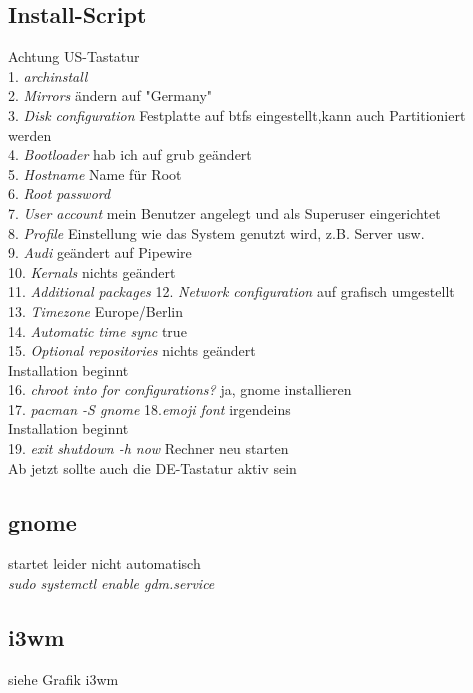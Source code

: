 \documentclass[10pt,a4paper,twoside]{book}
\begin{document}
\subsection{Install-Script}
Achtung US-Tastatur\\
1. \textit{archinstall}\\
2. \textit{Mirrors} ändern auf "Germany"\\
3. \textit{Disk configuration} Festplatte auf btfs eingestellt,kann auch Partitioniert werden\\
4. \textit{Bootloader} hab ich auf grub geändert\\
5. \textit{Hostname} Name für Root\\
6. \textit{Root password} \\
7. \textit{User account} mein Benutzer angelegt und als Superuser eingerichtet\\
8. \textit{Profile} Einstellung wie das System genutzt wird, z.B. Server usw.\\
9. \textit{Audi} geändert auf Pipewire\\
10. \textit{Kernals} nichts geändert\\
11. \textit{Additional packages}
12. \textit{Network configuration} auf grafisch umgestellt\\
13. \textit{Timezone} Europe/Berlin\\
14. \textit{Automatic time sync} true\\
15. \textit{Optional repositories} nichts geändert\\
Installation beginnt\\
16. \textit{chroot into for configurations?} ja, gnome installieren\\
17. \textit{pacman -S gnome}
18.\textit{emoji font} irgendeins\\
Installation beginnt\\
19. \textit{exit} \textit{shutdown -h now} Rechner neu starten\\
Ab jetzt sollte auch die DE-Tastatur aktiv sein\\
\subsection{gnome}
startet leider nicht automatisch\\
\textit{sudo systemctl enable gdm.service}
\subsection{i3wm}
siehe Grafik i3wm\\
\end{document}

